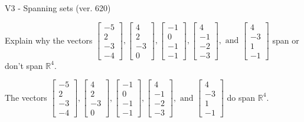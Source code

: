 \begin{exercise}
  \begin{exerciseTitle}V3 - Spanning sets (ver. 620)\end{exerciseTitle}
  \begin{exerciseStatement}
    Explain why the vectors \(\left[\begin{array}{r}
-5 \\
2 \\
-3 \\
-4
\end{array}\right] , \left[\begin{array}{r}
4 \\
2 \\
-3 \\
0
\end{array}\right] , \left[\begin{array}{r}
-1 \\
0 \\
-1 \\
-1
\end{array}\right] , \left[\begin{array}{r}
4 \\
-1 \\
-2 \\
-3
\end{array}\right] , \text{ and } \left[\begin{array}{r}
4 \\
-3 \\
1 \\
-1
\end{array}\right]\) span or don't span \(\mathbb{R}^4\). 
	


  \end{exerciseStatement}
  \begin{exerciseAnswer}
   The vectors \(\left[\begin{array}{r}
-5 \\
2 \\
-3 \\
-4
\end{array}\right] , \left[\begin{array}{r}
4 \\
2 \\
-3 \\
0
\end{array}\right] , \left[\begin{array}{r}
-1 \\
0 \\
-1 \\
-1
\end{array}\right] , \left[\begin{array}{r}
4 \\
-1 \\
-2 \\
-3
\end{array}\right] , \text{ and } \left[\begin{array}{r}
4 \\
-3 \\
1 \\
-1
\end{array}\right]\) 
  	 do  
	span \(\mathbb{R}^4\).
  



\end{exerciseAnswer}
\end{exercise}
